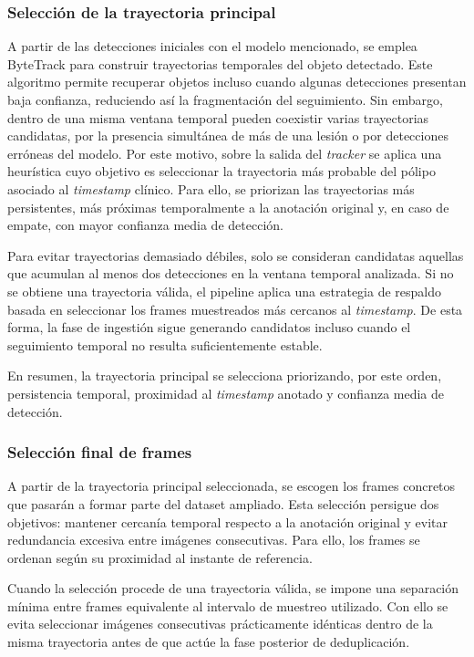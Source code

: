 ﻿\documentclass[10pt,a4paper,twocolumn,twoside]{article}
\begin{document}
\subsubsection{Selección de la trayectoria principal}
A partir de las detecciones iniciales con el modelo mencionado, se emplea ByteTrack\cite{zhang2022bytetrack} para construir trayectorias temporales del objeto detectado. Este algoritmo permite recuperar objetos incluso cuando algunas detecciones presentan baja confianza, reduciendo así la fragmentación del seguimiento. Sin embargo, dentro de una misma ventana temporal pueden coexistir varias trayectorias candidatas, por la presencia simultánea de más de una lesión o por detecciones erróneas del modelo. Por este motivo, sobre la salida del \textit{tracker} se aplica una heurística cuyo objetivo es seleccionar la trayectoria más probable del pólipo asociado al \textit{timestamp} clínico. Para ello, se priorizan las trayectorias más persistentes, más próximas temporalmente a la anotación original y, en caso de empate, con mayor confianza media de detección.

Para evitar trayectorias demasiado débiles, solo se consideran candidatas aquellas que acumulan al menos dos detecciones en la ventana temporal analizada. Si no se obtiene una trayectoria válida, el pipeline aplica una estrategia de respaldo basada en seleccionar los frames muestreados más cercanos al \textit{timestamp}. De esta forma, la fase de ingestión sigue generando candidatos incluso cuando el seguimiento temporal no resulta suficientemente estable.

En resumen, la trayectoria principal se selecciona priorizando, por este orden, persistencia temporal, proximidad al \textit{timestamp} anotado y confianza media de detección.

\subsubsection{Selección final de frames}
A partir de la trayectoria principal seleccionada, se escogen los frames concretos que pasarán a formar parte del dataset ampliado. Esta selección persigue dos objetivos: mantener cercanía temporal respecto a la anotación original y evitar redundancia excesiva entre imágenes consecutivas. Para ello, los frames se ordenan según su proximidad al instante de referencia.

Cuando la selección procede de una trayectoria válida, se impone una separación mínima entre frames equivalente al intervalo de muestreo utilizado. Con ello se evita seleccionar imágenes consecutivas prácticamente idénticas dentro de la misma trayectoria antes de que actúe la fase posterior de deduplicación.
\end{document}
